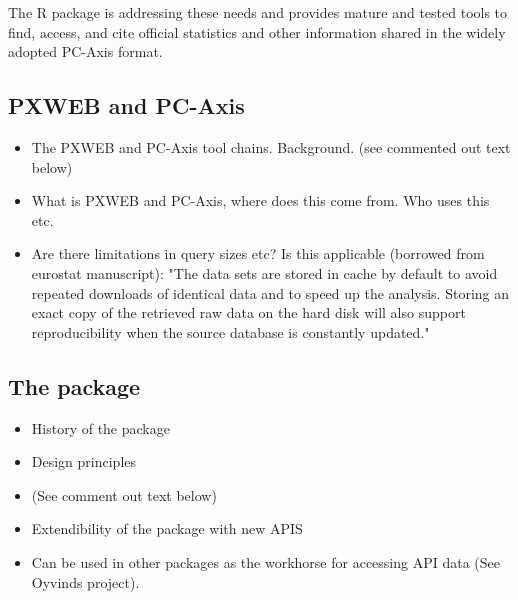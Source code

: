 
The  R package is addressing these needs and provides
mature and tested tools to find, access, and cite official statistics
and other information shared in the widely adopted PC-Axis format.


\subsection[PXWEB and PC-Axis]{PXWEB and PC-Axis}

\begin{itemize}
    \item The PXWEB and PC-Axis tool chains. Background. (see commented out text below)
    \item What is PXWEB and PC-Axis, where does this come from. Who uses this etc.
    \item Are there limitations in query sizes etc? Is this applicable (borrowed from eurostat manuscript): "The data sets are stored in cache by default to avoid repeated downloads of identical data and to speed up the analysis. Storing an exact copy of the retrieved raw data on the hard disk will also support reproducibility when the source database is constantly updated."
\end{itemize}


\subsection{The  package}

\begin{itemize}
    \item History of the package
    \item Design principles
    \item (See comment out text below)
    \item Extendibility of the package with new APIS
    \item Can be used in other packages as the workhorse for accessing API data (See Oyvinds project).
\end{itemize}

